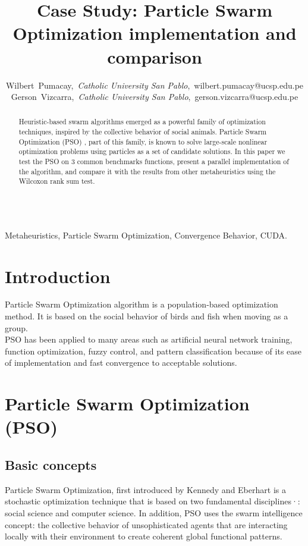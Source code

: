 \documentclass[journal]{IEEEtran}
\begin{document}
\title{Case Study: Particle Swarm Optimization implementation and comparison}

\author{Wilbert~Pumacay,~\textit{Catholic University San Pablo},~wilbert.pumacay@ucsp.edu.pe\\
        Gerson~Vizcarra,~\textit{Catholic University San Pablo},~gerson.vizcarra@ucsp.edu.pe}

\maketitle

\begin{abstract}
Heuristic-based swarm algorithms emerged as a powerful family of optimization techniques, inspired by the collective behavior of social animals. Particle Swarm Optimization (PSO) , part of this family, is known to solve large-scale nonlinear optimization problems using particles as a set of candidate solutions. In this paper we test the PSO on 3 common benchmarks functions, present a parallel implementation of the algorithm, and compare it with the results from other metaheuristics using the Wilcoxon rank sum test. 
\\
\\
\end{abstract}

\begin{IEEEkeywords}
Metaheuristics, Particle Swarm Optimization, Convergence Behavior, CUDA.
\end{IEEEkeywords}


\section{Introduction}

 Particle Swarm Optimization algorithm is a population-based optimization method. It is based on the social behavior of birds and fish when moving as a group.\\

PSO has been applied to many areas such as artificial neural network training, function optimization, fuzzy control, and pattern classification because of its ease of implementation and fast convergence to acceptable solutions.

\section{ Particle Swarm Optimization (PSO) }
\subsection{ Basic concepts }
Particle Swarm Optimization, first introduced by Kennedy and Eberhart \cite{Kennedy1995} is a stochastic optimization technique that is based on two fundamental disciplines·\cite{delValle2008}: social science and computer science. In addition, PSO uses the swarm intelligence concept: the collective behavior of unsophisticated agents that are interacting locally with their environment to create coherent global functional patterns.
\end{document}
